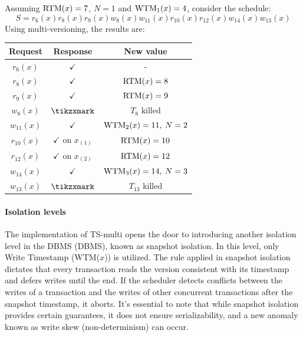\begin{example}
    Assuming $\textnormal{RTM}(x)=7$, $N=1$ and $\textnormal{WTM}_1(x)=4$, consider the schedule:
    \[S=r_6(x) r_8(x) r_9(x) w_8(x) w_{11}(x) r_{10}(x) r_{12}(x) w_{14}(x) w_{13}(x)\]
    Using multi-versioning, the results are:
    \begin{table}[H]
        \centering
        \begin{tabular}{ccc}
        \textbf{Request} & \textbf{Response}         & \textbf{New value}  \\ \hline
        $r_6(x)$         & $\checkmark$              & -                   \\
        $r_8(x)$         & $\checkmark$              & $\textnormal{RTM}(x)=8$          \\
        $r_9(x)$         & $\checkmark$              & $\textnormal{RTM}(x)=9$          \\
        $w_8(x)$         & $\tikzxmark$              & $T_8$ killed        \\
        $w_{11}(x)$      & $\checkmark$              & $\textnormal{WTM}_2(x)=11,\:N=2$ \\
        $r_{10}(x)$      & $\checkmark$ on $x_{(1)}$ & $\textnormal{RTM}(x)=10$         \\
        $r_{12}(x)$      & $\checkmark$ on $x_{(2)}$ & $\textnormal{RTM}(x)=12$         \\
        $w_{14}(x)$      & $\checkmark$              & $\textnormal{WTM}_3(x)=14,\:N=3$ \\
        $w_{13}(x)$      & $\tikzxmark$              & $T_{13}$ killed
        \end{tabular}
    \end{table}
\end{example}

\paragraph*{Isolation levels}
The implementation of TS-multi opens the door to introducing another isolation level in the DBMS (DBMS), known as snapshot isolation.
In this level, only Write Timestamp (WTM($x$)) is utilized.
The rule applied in snapshot isolation dictates that every transaction reads the version consistent with its timestamp and defers writes until the end. 
If the scheduler detects conflicts between the writes of a transaction and the writes of other concurrent transactions after the snapshot timestamp, it aborts.
It's essential to note that while snapshot isolation provides certain guarantees, it does not ensure serializability, and a new anomaly known as write skew (non-determinism) can occur.
